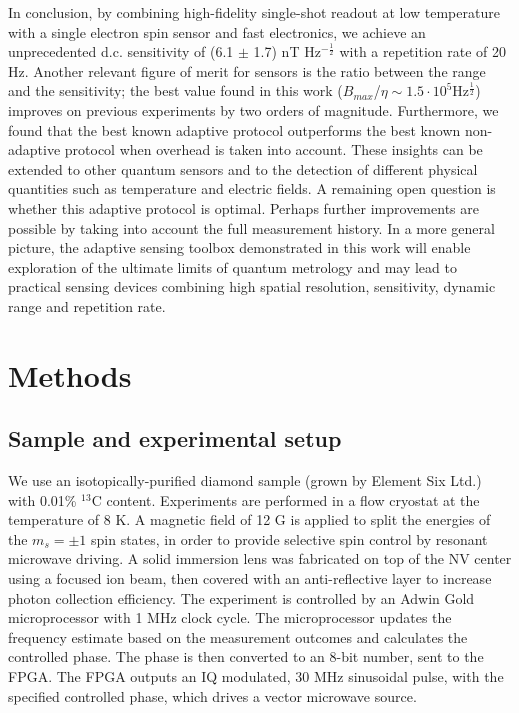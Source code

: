 In conclusion, by combining high-fidelity single-shot readout at low temperature with a single electron spin sensor and fast electronics, we achieve an unprecedented d.c. sensitivity of (6.1 $\pm$ 1.7) nT Hz$^{-\frac{1}{2}}$ with a repetition rate of 20 Hz. Another relevant figure of merit for sensors is the ratio between the range and the sensitivity; the best value found in this work ($B_{max}$/$\eta \sim 1.5 \cdot 10^5 $Hz$^{\frac{1}{2}}$) improves on previous experiments by two orders of magnitude\cite{Waldherr_NatNano_2012,Nusran_NatNano_2012}. Furthermore, we found that the best known adaptive protocol outperforms the best known non-adaptive protocol when overhead is taken into account. These insights can be extended to other quantum sensors and to the detection of different physical quantities such as temperature and electric fields. A remaining open question is whether this adaptive protocol is optimal. Perhaps further improvements are possible by taking into account the full measurement history. In a more general picture, the adaptive sensing toolbox demonstrated in this work will enable exploration of the ultimate limits of quantum metrology and may lead to practical sensing devices combining high spatial resolution, sensitivity, dynamic range and repetition rate.



\section{Methods}
\subsection{Sample and experimental setup}
We use an isotopically-purified diamond sample (grown by Element Six Ltd.) with 0.01\% $^{13}$C content. Experiments are performed in a flow cryostat at the temperature of 8 K. A magnetic field of 12 G is applied to split the energies of the $m_s = \pm 1$ spin states, in order to provide selective spin control by resonant microwave driving. A solid immersion lens was fabricated on top of the NV center using a focused ion beam, then covered with an anti-reflective layer to increase photon collection efficiency.  
The experiment is controlled by an Adwin Gold microprocessor with 1 MHz clock cycle. The microprocessor updates the frequency estimate based on the measurement outcomes and calculates the controlled phase. The phase is then converted to an 8-bit number, sent to the FPGA. The FPGA outputs an IQ modulated, 30 MHz sinusoidal pulse, with the specified controlled phase, which drives a vector microwave source.

